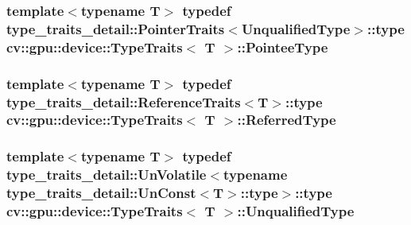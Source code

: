 \hypertarget{structcv_1_1gpu_1_1device_1_1TypeTraits_a9767965cf3dcc3ac52c3ab7c23e54cd0}{
\subsubsection[{Pointee\-Type}]{\setlength{\rightskip}{0pt plus 5cm}template$<$typename T$>$ typedef {\bf type\-\_\-traits\-\_\-detail\-::\-Pointer\-Traits}$<${\bf Unqualified\-Type}$>$\-::{\bf type} {\bf cv\-::gpu\-::device\-::\-Type\-Traits}$<$ {\bf T} $>$\-::{\bf Pointee\-Type}}}\label{structcv_1_1gpu_1_1device_1_1TypeTraits_a9767965cf3dcc3ac52c3ab7c23e54cd0}
\hypertarget{structcv_1_1gpu_1_1device_1_1TypeTraits_a8fca712a58b7b161f578010412278a97}{
\subsubsection[{Referred\-Type}]{\setlength{\rightskip}{0pt plus 5cm}template$<$typename T$>$ typedef {\bf type\-\_\-traits\-\_\-detail\-::\-Reference\-Traits}$<${\bf T}$>$\-::{\bf type} {\bf cv\-::gpu\-::device\-::\-Type\-Traits}$<$ {\bf T} $>$\-::{\bf Referred\-Type}}}\label{structcv_1_1gpu_1_1device_1_1TypeTraits_a8fca712a58b7b161f578010412278a97}
\hypertarget{structcv_1_1gpu_1_1device_1_1TypeTraits_aa4919b39d8e375e205450f59857419a3}{
\subsubsection[{Unqualified\-Type}]{\setlength{\rightskip}{0pt plus 5cm}template$<$typename T$>$ typedef {\bf type\-\_\-traits\-\_\-detail\-::\-Un\-Volatile}$<$typename {\bf type\-\_\-traits\-\_\-detail\-::\-Un\-Const}$<${\bf T}$>$\-::{\bf type}$>$\-::{\bf type} {\bf cv\-::gpu\-::device\-::\-Type\-Traits}$<$ {\bf T} $>$\-::{\bf Unqualified\-Type}}}\label{structcv_1_1gpu_1_1device_1_1TypeTraits_aa4919b39d8e375e205450f59857419a3}


